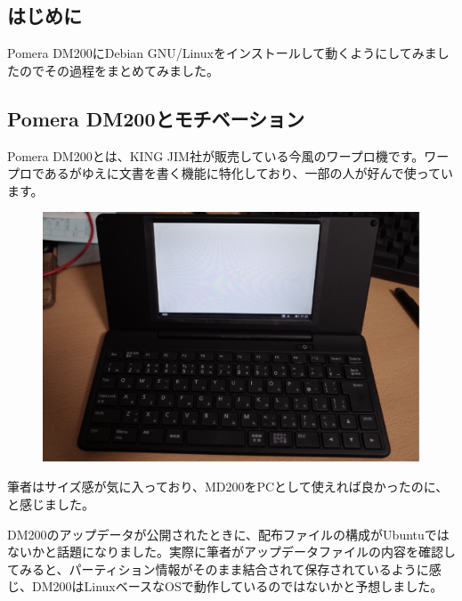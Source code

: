 \documentclass[mingoth,a4paper]{jsarticle}
\begin{document}

\subsection{はじめに}

Pomera DM200にDebian GNU/Linuxをインストールして動くようにしてみましたのでその過程をまとめてみました。


\subsection{Pomera DM200とモチベーション}

Pomera DM200とは、KING JIM社が販売している今風のワープロ機です。ワープロであるがゆえに文書を書く機能に特化しており、一部の人が好んで使っています。

\begin{figure}[h]
  \begin{center}
    \includegraphics[scale=0.5]{image201709/dm200.png}
  \end{center}
\end{figure}

筆者はサイズ感が気に入っており、MD200をPCとして使えれば良かったのに、と感じました。

DM200のアップデータが公開されたときに、配布ファイルの構成がUbuntuではないかと話題になりました。実際に筆者がアップデータファイルの内容を確認してみると、パーティション情報がそのまま結合されて保存されているように感じ、DM200はLinuxベースなOSで動作しているのではないかと予想しました。
\end{document}
